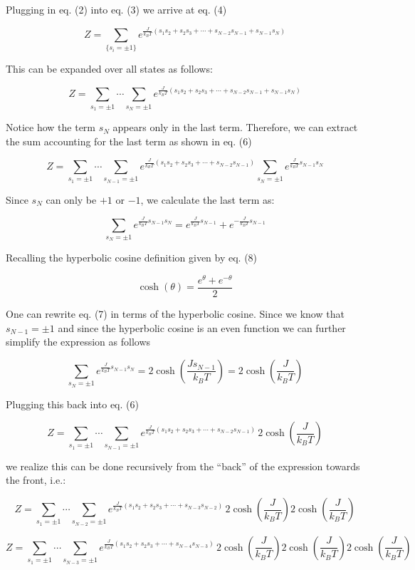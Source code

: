 ﻿\documentclass[11pt]{article}
\begin{document}
Plugging in eq. (2) into eq. (3) we arrive at eq. (4)

\[
Z=\sum_{\{s_i=\pm1\}} e^{\frac{J}{k_B T}(s_1s_2+s_2s_3+\cdots+s_{N-2}s_{N-1}+s_{N-1}s_N)} \tag{4}
\]

This can be expanded over all states as follows:

\[
Z=\sum_{s_1=\pm1}\cdots\sum_{s_N=\pm1}e^{\frac{J}{k_B T}(s_1s_2+s_2s_3+\cdots+s_{N-2}s_{N-1}+s_{N-1}s_N)} \tag{5}
\]

Notice how the term \(s_N\) appears only in the last term. Therefore, we
can extract the sum accounting for the last term as shown in eq. (6)

\[
Z=\sum_{s_1=\pm1}\cdots\sum_{s_{N-1}=\pm1}e^{\frac{J}{k_B T}(s_1s_2+s_2s_3+\cdots+s_{N-2}s_{N-1})} \sum_{s_N=\pm1} e^{\frac{J}{k_B T}s_{N-1}s_N} \tag{6}
\]

Since \(s_N\) can only be \(+1\) or \(-1\), we calculate the last term
as:

\[
\sum_{s_N=\pm1} e^{\frac{J}{k_B T}s_{N-1}s_N} = e^{\frac{J}{k_B T}s_{N-1}} + e^{-\frac{J}{k_B T}s_{N-1}} \tag{7}
\]

Recalling the hyperbolic cosine definition given by eq. (8)

\[
\cosh(\theta)=\frac{e^{\theta}+e^{-\theta}}{2} \tag{8}
\]

One can rewrite eq. (7) in terms of the hyperbolic cosine. Since we know
that \(s_{N-1}=\pm1\) and since the hyperbolic cosine is an even
function we can further simplify the expression as follows

\[
\sum_{s_N=\pm1} e^{\frac{J}{k_B T}s_{N-1}s_N} = 2\cosh\left(\frac{Js_{N-1}}{k_B T}\right) = 2\cosh\left(\frac{J}{k_B T}\right) \tag{9}
\]

Plugging this back into eq. (6)

\[
Z=\sum_{s_1=\pm1}\cdots\sum_{s_{N-1}=\pm1}e^{\frac{J}{k_B T}(s_1s_2+s_2s_3+\cdots+s_{N-2}s_{N-1})}\, 2\cosh\left(\frac{J}{k_B T}\right) \tag{10}
\]

we realize this can be done recursively from the ``back'' of the
expression towards the front, i.e.:

\[
Z=\sum_{s_1=\pm1}\cdots\sum_{s_{N-2}=\pm1}e^{\frac{J}{k_B T}(s_1s_2+s_2s_3+\cdots+s_{N-3}s_{N-2})}\, 2\cosh\left(\frac{J}{k_B T}\right) 2\cosh\left(\frac{J}{k_B T}\right) \tag{11}
\]

\[
Z=\sum_{s_1=\pm1}\cdots\sum_{s_{N-3}=\pm1}e^{\frac{J}{k_B T}(s_1s_2+s_2s_3+\cdots+s_{N-4}s_{N-3})}\, 2\cosh\left(\frac{J}{k_B T}\right) 2\cosh\left(\frac{J}{k_B T}\right) 2\cosh\left(\frac{J}{k_B T}\right) \tag{12}
\]
\end{document}

